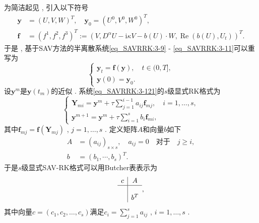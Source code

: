 为简洁起见 , 引入以下符号
\begin{equation}
	\begin{aligned}
		\bm{y}&=\left(U , V , W\right)^T , \quad\bm{y}_0=\left(U^0 , V^0 , W^0\right)^T  , \\
		\bm{f}&=(f^1 , f^2 , f^3)^T:=(V , D^{\alpha} U-\mathrm{i}\kappa V-b(U)\cdot W , \operatorname{Re}\left(b(U) , U_t\right))^T . 
	\end{aligned}
\end{equation}
于是 , 基于SAV方法的半离散系统\eqref{eq_SAVRRK:3-9} - \eqref{eq_SAVRRK:3-11}可以重写为
\begin{equation}
\left\{\begin{array}{l}
\bm{y}_t=\bm{f}(\bm{y}) , \quad t \in(0 , T] , \\
\bm{y}(0)=\bm{y}_0 . 
\end{array}\right . \label{eq_SAVRRK:3-121}
\end{equation}
设$\bm{y}^m$是$\bm{y}\left(t_m\right)$的近似 . 系统\eqref{eq_SAVRRK:3-121}的$s$级显式RK格式\cite{hairerRungeKuttaMethods2015}为
\begin{equation}
\left\{\begin{array}{l}
\bm{Y}_{m i}=\bm{y}^m+\tau \sum\limits_{j=1}^{i-1} a_{i j} \bm{f}_{m j} , \quad i=1 , \ldots , s , \\
\bm{y}^{m+1}=\bm{y}^m+\tau \sum\limits_{i=1}^s b_i \bm{f}_{m i} , 
\end{array}\right . \label{eq_SAVRRK:4-31}
\end{equation}
其中$\bm{f}_{m j}=\bm{f}\left(\bm{Y}_{m j}\right)$ , $j=1 , \ldots , s$ . 
定义矩阵$A$和向量$b$如下
\begin{equation}
\begin{aligned}
A & =\left(a_{i j}\right)_{s \times s} , \quad a_{i j}=0 \quad \text {对于} \quad j \geq i , \\
b & =\left(b_1 , \cdots , b_s\right)^T . 
\end{aligned}
\end{equation}
于是$s$级显式SAV-RK格式可以用Butcher表表示为
\begin{equation}
\begin{array}{c|c}
c & A \\
\hline \\
& b^T
\end{array} , 
\end{equation}
其中向量$c=(c_1 , c_2 , \dots , c_s)$满足$c_i=\sum\limits_{j=1}^s a_{i j}$ , $i=1 , \ldots , s$ . 

